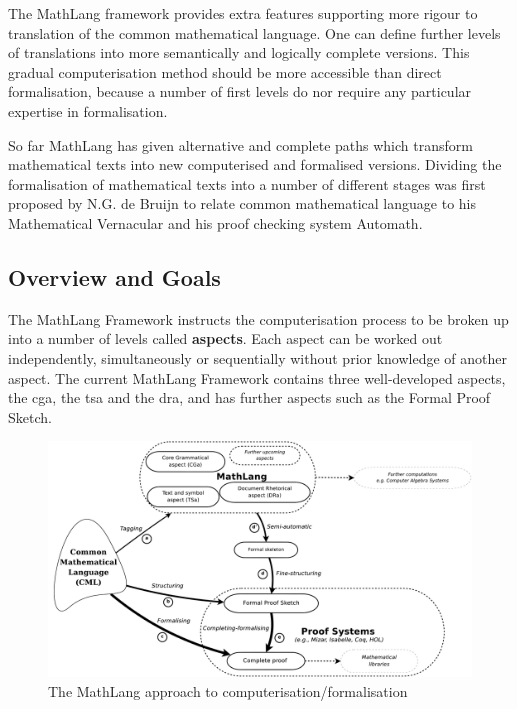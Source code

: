 The MathLang framework provides extra features supporting more rigour to
translation of the common mathematical language. One can define further levels
of translations into more semantically and logically complete versions. This
gradual computerisation method should be more accessible than direct
formalisation, because a number of first levels do nor require any particular
expertise in formalisation.

So far MathLang has given alternative and complete paths which transform
mathematical texts into new computerised and formalised versions. Dividing the
formalisation of mathematical texts into a number of different stages was first
proposed by N.G. de Bruijn to relate common mathematical language to his
Mathematical Vernacular \cite{mv} and his proof checking system Automath.

\subsection{Overview and Goals}

The MathLang Framework instructs the computerisation process to be broken up
into a number of levels called \textbf{aspects}. Each aspect can be worked out
independently, simultaneously or sequentially without prior knowledge of another
aspect. The current MathLang Framework contains three well-developed aspects,
the \gls{cga}, the \gls{tsa} and the \gls{dra}, and has further aspects such as
the Formal Proof Sketch.

\begin{figure}[H]
\begin{center}
\includegraphics[scale=0.255]{Figures/Background/mathlang.png}
\end{center}
\caption{The MathLang approach to computerisation/formalisation \cite{mathintomizar}\label{fig:mathlang}}
\end{figure}

